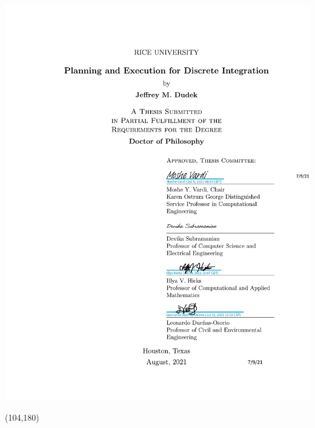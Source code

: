\documentclass[12pt]{sty/ruthesis}
\begin{document}
\begin{frontmatter}
\begin{textblock}{80}
   	\includegraphics[page=1,clip,trim=110mm 119mm 10mm 149mm]{coverpage.pdf}
   \end{textblock}
   \begin{textblock}{80}(104,180)

\end{textblock}
\end{frontmatter}
\end{document}
